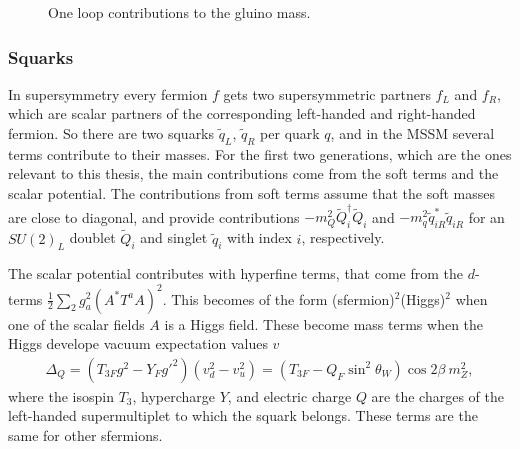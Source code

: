 \documentclass[twoside,english]{uiofysmaster}
\begin{document}
\begin{figure}
\caption{One loop contributions to the gluino mass.}
\label{Fig:: physical background : Gluino loop contributions}
\end{figure}

\subsubsection{Squarks}
In supersymmetry every fermion $f$ gets two supersymmetric partners $f_L$ and $f_R$, which are scalar partners of the corresponding left-handed and right-handed fermion. So there are two squarks $\tilde{q}_L$, $\tilde{q}_R$ per quark $q$, and in the MSSM several terms contribute to their masses. For the first two generations, which are the ones relevant to this thesis, the main contributions come from the soft terms and the scalar potential. The contributions from soft terms assume that the soft masses are close to diagonal, and provide contributions $-m_Q^2 \tilde{Q}_i^{\dagger} \tilde{Q}_i$ and $-m_q^2 \tilde{q}_{iR}^* \tilde{q}_{iR}$ for an $SU(2)_L$ doublet $\tilde{Q}_i$ and singlet $\tilde{q}_i$ with index $i$, respectively. 

The scalar potential contributes with hyperfine terms, that come from the $d$-terms $\frac{1}{2} \sum_2 g_a^2 (A^* T^a A)^2$. This becomes of the form (sfermion)$^2$(Higgs)$^2$ when one of the scalar fields $A$ is a Higgs field. These become mass terms when the Higgs develope vacuum expectation values $v$
\begin{align}
\Delta_Q = (T_{3F}g^2 - Y_F{g'}^2)(v_d^2 - v_u^2) = (T_{3F} - Q_F \sin^2 \theta_W ) \cos 2 \beta ~ m_Z^2,
\end{align} 
where the isospin $T_3$, hypercharge $Y$, and electric charge $Q$ are the charges of the left-handed supermultiplet to which the squark belongs. These terms are the same for other sfermions. 
\end{document}
